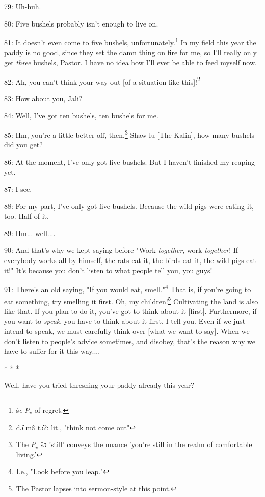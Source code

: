 79: Uh-huh.

80: Five bushels probably isn't enough to live on.

81: It doesn't even come to five bushels, unfortunately.\footnote{š\emph{e} $P_v$ of regret.} In my field this year
the paddy is no good, since they set the damn thing on fire for me, so I'll really
only get \textit{three} bushels, Pastor. I have no idea how I'll ever be able to
feed myself now.

82: Ah, you can't think your way out [of a situation like this]!\footnote{dɔ̂ mâ tɔ̂ʔ: lit., "think not come out"}

83: How about you, Jali?

84: Well, I've got ten bushels, ten bushels for me.

85: Hm, you're a little better off, then.\footnote{The $P_v$ š\emph{ɔ} 'still' conveys the nuance 'you're still in the realm of comfortable living.'} Shaw-lu [The Kalin], how many bushels
did you get?

86: At the moment, I've only got five bushels. But I haven't finished my reaping
yet.

87: I see.

88: For my part, I've only got five bushels. Because the wild pigs were eating
it, too. Half of it.

89: Hm... well....

90: And that's why we kept saying before "Work\textit{ together}, work
\textit{together}! If everybody works all by himself, the rats eat it, the birds
eat it, the wild pigs eat it!" It's because you don't listen to what people
tell you, you guys!

91: There's an old saying, "If you would eat, smell."\footnote{I.e., "Look before you leap."} That
is, if you're going to eat something, try smelling it first. Oh, my children!\footnote{The Pastor lapses into sermon-style at this point.}
Cultivating the land is also like that. If you plan to do it, you've got to think
about it [first]. Furthermore, if you want to \textit{speak}, you have to think
about it first, I tell you. Even if we just intend to speak, we must carefully
think over [what we want to say]. When we don't listen to people's advice sometimes,
and disobey, that's the reason why we have to suffer for it this way....

\begin{center}
* * *
\end{center}

\leftskip=0pt
Well, have you tried threshing your paddy already this year?

